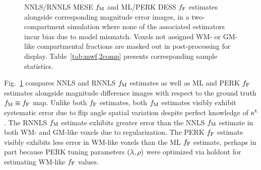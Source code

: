 \begin{figure}[!t]
	\centering
	\hspace{0cm}
	\caption{%
		NNLS/RNNLS MESE $f_\mathrm{M}$ and ML/PERK DESS $f_{\mathrm{F}}$ estimates 
		alongside corresponding magnitude error images,
		in a two-compartment simulation
		where none of the associated estimators
		incur bias due to model mismatch.
		Voxels not assigned WM- or GM-like compartmental fractions
		are masked out in post-processing for display.
		Table~\ref{tab:mwf,2comp} presents corresponding sample statistics.
	}
	\label{fig:mwf,2comp}
\end{figure}

Fig.~\ref{fig:mwf,2comp} compares NNLS and RNNLS $f_\mathrm{M}$ estimates
as well as ML and PERK $f_{\mathrm{F}}$ estimates 
alongside magnitude difference images
with respect to the ground truth $f_\mathrm{M} \equiv f_{\mathrm{F}}$ map.
Unlike both $f_{\mathrm{F}}$ estimates,
both $f_\mathrm{M}$ estimates visibly exhibit systematic error
due to flip angle spatial variation
despite perfect knowledge of $\kappa^{\mathrm{t}}$.
The RNNLS $f_\mathrm{M}$ estimate exhibits greater error
than the NNLS $f_\mathrm{M}$ estimate
in both WM- and GM-like voxels
due to regularization.
The PERK $f_{\mathrm{F}}$ estimate visibly exhibits less error 
in WM-like voxels
than the ML $f_{\mathrm{F}}$ estimate,
perhaps in part because PERK tuning parameters $\paren{\lambda,\rho}$
were optimized via holdout 
for estimating WM-like $f_{\mathrm{F}}$ values.
  
